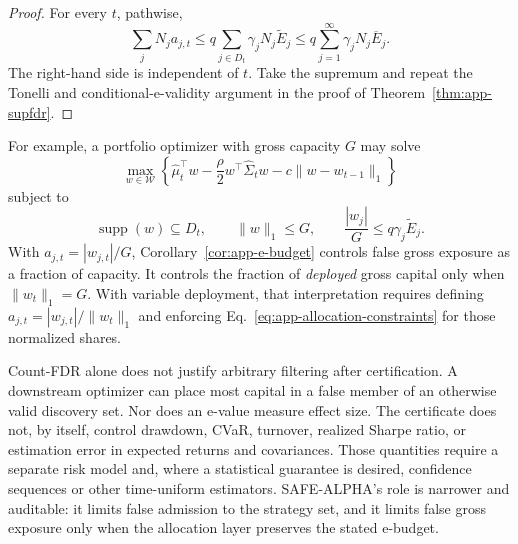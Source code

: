 \begin{proof}
For every \(t\), pathwise,
\[
 \sum_jN_ja_{j,t}
 \leq q\sum_{j\in D_t}\gamma_jN_j\widetilde E_j
 \leq q\sum_{j=1}^{\infty}\gamma_jN_j\overline E_j.
\]
The right-hand side is independent of \(t\).  Take the supremum and repeat
the Tonelli and conditional-e-validity argument in the proof of
Theorem~\ref{thm:app-supfdr}.
\end{proof}

For example, a portfolio optimizer with gross capacity \(G\) may solve
\[
 \max_{w\in\mathcal W}
 \left\{
   \widehat\mu_t^\top w
   -\frac{\rho}{2}w^\top\widehat\Sigma_tw
   -c\lVert w-w_{t-1}\rVert_1
 \right\}
\]
subject to
\begin{equation}
 \operatorname{supp}(w)\subseteq D_t,\qquad
 \lVert w\rVert_1\leq G,\qquad
 \frac{|w_j|}{G}\leq q\gamma_j\widetilde E_j.
 \label{eq:app-optimizer-constraints}
\end{equation}
With \(a_{j,t}=|w_{j,t}|/G\), Corollary~\ref{cor:app-e-budget} controls false
gross exposure as a fraction of capacity.  It controls the fraction of
\emph{deployed} gross capital only when \(\lVert w_t\rVert_1=G\).  With
variable deployment, that interpretation requires defining
\(a_{j,t}=|w_{j,t}|/\lVert w_t\rVert_1\) and enforcing
Eq.~\eqref{eq:app-allocation-constraints} for those normalized shares.

Count-FDR alone does not justify arbitrary filtering after certification.
A downstream optimizer can place most capital in a false
member of an otherwise valid discovery set.  Nor does an e-value measure
effect size.  The certificate does not, by itself, control drawdown, CVaR,
turnover, realized Sharpe ratio, or estimation error in expected returns and
covariances.  Those quantities require a separate risk model and, where a
statistical guarantee is desired, confidence sequences or other
time-uniform estimators.  SAFE-ALPHA's role is narrower and auditable: it
limits false admission to the strategy set, and it limits false gross
exposure only when the allocation layer preserves the stated e-budget.
